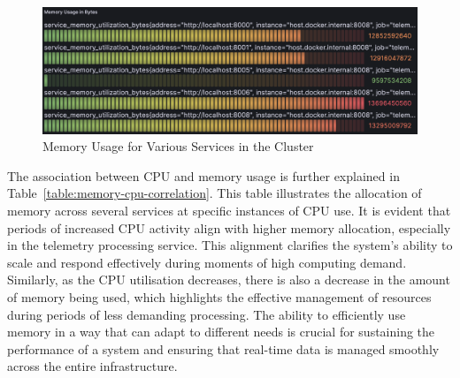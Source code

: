 \documentclass[preprint,12pt]{elsarticle}
\begin{document}
\begin{figure}[h!]
  \centering
  \includegraphics[width=\textwidth]{images/Memory-usage-for-various-services-in-kube.png}
  \caption{Memory Usage for Various Services in the Cluster}
  \label{kubernetesClusterMemoryUsage}
\end{figure}

The association between CPU and memory usage is further explained in Table~\ref{table:memory-cpu-correlation}. This table illustrates the allocation of memory across several services at specific instances of CPU use. It is evident that periods of increased CPU activity align with higher memory allocation, especially in the telemetry processing service. This alignment clarifies the system's ability to scale and respond effectively during moments of high computing demand. Similarly, as the CPU utilisation decreases, there is also a decrease in the amount of memory being used, which highlights the effective management of resources during periods of less demanding processing. The ability to efficiently use memory in a way that can adapt to different needs is crucial for sustaining the performance of a system and ensuring that real-time data is managed smoothly across the entire infrastructure.
\end{document}
